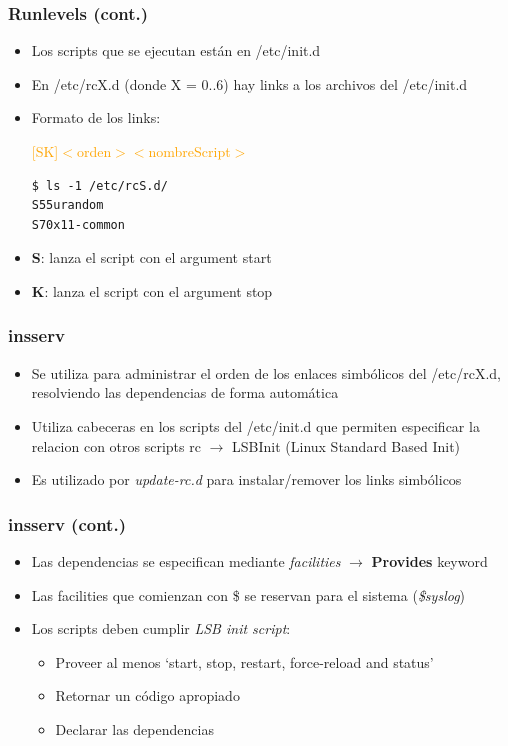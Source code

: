 \begin{frame}[fragile]
  \frametitle{Runlevels (cont.)}
  \begin{itemize}
	  	\item Los scripts que se ejecutan están en /etc/init.d
	  	\item En /etc/rcX.d (donde X = 0..6) hay links a los archivos del /etc/init.d
	  	\item Formato de los links:

	  	\textcolor{orange}{[S\textbar K]$<$orden$>$$<$nombreScript$>$}
		\begin{lstlisting}
$ ls -1 /etc/rcS.d/
S55urandom
S70x11-common
		\end{lstlisting}
		\item \textbf{S}: lanza el script con el argument start
		\item \textbf{K}: lanza el script con el argument stop
  \end{itemize}
\end{frame}

\begin{frame}
  \frametitle{\textbf{insserv}}
  \begin{itemize}
	  	\item Se utiliza para administrar el orden de los enlaces simbólicos del /etc/rcX.d, resolviendo las dependencias de forma automática
	  	\item Utiliza cabeceras en los scripts del /etc/init.d que permiten especificar la relacion con otros scripts rc $\rightarrow$ LSBInit (Linux Standard Based Init)
		\item Es utilizado por \textit{update-rc.d} para instalar/remover los links simbólicos
  \end{itemize}
\end{frame}

\begin{frame}
  \frametitle{\textbf{insserv} (cont.)}
  \begin{itemize}
		\item Las dependencias se especifican mediante \textit{facilities} $\rightarrow$ \textbf{Provides} keyword
		\item Las facilities que comienzan con \$ se reservan para el sistema (\textit{\$syslog})
		\item Los scripts deben cumplir \textit{LSB init script}:
		\begin{itemize}
			\item Proveer al menos `start, stop, restart, force-reload and status'
			\item Retornar un código apropiado
			\item Declarar las dependencias
		\end{itemize}
  \end{itemize}
\end{frame}


